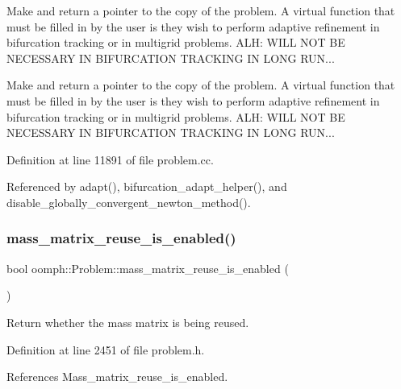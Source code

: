 Make and return a pointer to the copy of the problem. A virtual function that must be filled in by the user is they wish to perform adaptive refinement in bifurcation tracking or in multigrid problems. A\+LH\+: W\+I\+LL N\+OT BE N\+E\+C\+E\+S\+S\+A\+RY IN B\+I\+F\+U\+R\+C\+A\+T\+I\+ON T\+R\+A\+C\+K\+I\+NG IN L\+O\+NG R\+UN... 

Make and return a pointer to the copy of the problem. A virtual function that must be filled in by the user is they wish to perform adaptive refinement in bifurcation tracking or in multigrid problems. A\+LH\+: W\+I\+LL N\+OT BE N\+E\+C\+E\+S\+S\+A\+RY IN B\+I\+F\+U\+R\+C\+A\+T\+I\+ON T\+R\+A\+C\+K\+I\+NG IN L\+O\+NG R\+UN... 

Definition at line 11891 of file problem.\+cc.



Referenced by adapt(), bifurcation\+\_\+adapt\+\_\+helper(), and disable\+\_\+globally\+\_\+convergent\+\_\+newton\+\_\+method().

\mbox{\label{classoomph_1_1Problem_afa46c693258868c126503cce3a663a85}} 
\subsubsection{\texorpdfstring{mass\+\_\+matrix\+\_\+reuse\+\_\+is\+\_\+enabled()}{mass\_matrix\_reuse\_is\_enabled()}}
{\footnotesize\ttfamily bool oomph\+::\+Problem\+::mass\+\_\+matrix\+\_\+reuse\+\_\+is\+\_\+enabled (\begin{DoxyParamCaption}{ }\end{DoxyParamCaption})\hspace{0.3cm}{\ttfamily [inline]}}



Return whether the mass matrix is being reused. 



Definition at line 2451 of file problem.\+h.



References Mass\+\_\+matrix\+\_\+reuse\+\_\+is\+\_\+enabled.

\mbox{\label{classoomph_1_1Problem_af40d864609f3c2b85cab8fb9fadc439d}} 
